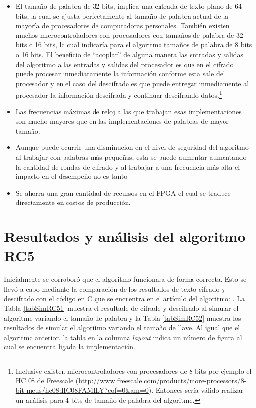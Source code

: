\begin{itemize}
\item El tamaño de palabra de 32 bits, implica una entrada de texto plano de 64 bits, la cual se ajusta perfectamente al tamaño de palabra actual de la mayoría de procesadores de computadoras personales. También existen muchos microcontroladores con procesadores con tamaños de palabra de 32 bits o 16 bits, lo cual indicaría para el algoritmo tamaños de palabra de 8 bits o 16 bits. El beneficio de ``acoplar'' de alguna manera las entradas y salidas del algoritmo a las entradas y salidas del procesador es que en el cifrado puede procesar inmediatamente la información conforme esta sale del procesador y en el caso del descifrado es que puede entregar inmediamente al procesador la información descifrada y continuar descifrando datos.\footnote{Inclusive existen microcontroladores con procesadores de 8 bits por ejemplo el HC 08 de Freescale (\url{http://www.freescale.com/products/more-processors/8-bit-mcus/hc08:HC08FAMILY?cof=0&am=0}). Entonces sería válido realizar un análisis para 4 bits de tamaño de palabra del algoritmo.}

\item Las frecuencias máximas de reloj a las que trabajan esas implementaciones son mucho mayores que en las implementaciones de palabras de mayor tamaño.

\item Aunque puede ocurrir una disminución en el nivel de seguridad del algoritmo al trabajar con palabras más pequeñas, esta se puede aumentar aumentando la cantidad de rondas de cifrado y al trabajar a una frecuencia más alta el impacto en el desempeño no es tanto.

\item Se ahorra una gran cantidad de recursos en el FPGA el cual se traduce directamente en costos de producción.
\end{itemize}

\clearpage
\section{Resultados y análisis del algoritmo RC5}
Inicialmente se corroboró que el algoritmo funcionara de forma correcta. Esto se llevó a cabo mediante la comparación de los resultados de texto cifrado y descifrado con el código en C que se encuentra en el artículo del algoritmo: \citep{rivest}. La Tabla \ref{tabSimRC51} muestra el resultado de cifrado y descifrado al simular el algoritmo variando el tamaño de palabra y la Tabla \ref{tabSimRC52} muestra los resultados de simular el algoritmo variando el tamaño de llave. Al igual que el algoritmo anterior, la tabla en la columna \textit{layout} indica un número de figura al cual se encuentra ligada la implementación.

